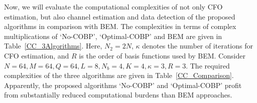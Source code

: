 \documentclass[12pt, draftclsnofoot, onecolumn]{IEEEtran}
\begin{document}

Now, we will evaluate the computational complexities of not only CFO estimation, but also channel estimation and data detection of the proposed algorithms in comparison with BEM. The complexities in terms of complex multiplications of `No-COBP', `Optimal-COBP' and BEM are given in Table~\ref{CC_3Algorithms}. Here, $N_2 \!=\! 2N$, $\kappa$ denotes the number of iterations for CFO estimation, and $R$ is the order of basis functions used by BEM.
Consider $N\!=\!64, M\!=\!64, Q \!=\!64, L \!=\!8, N_b\!=\!4, K\!=\!4, \kappa\!=\!3, R \!=\!3$. The required complexities of the three algorithms are given in Table~\ref{CC_Comparison}. Apparently, the proposed algorithms `No-COBP' and `Optimal-COBP' profit from substantially reduced computational burdens than BEM approaches.
\end{document}
